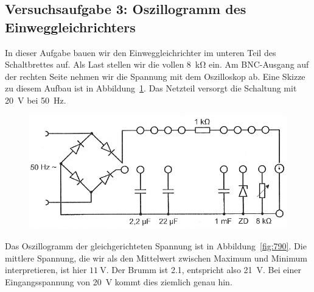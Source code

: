 \FloatBarrier
\subsection{Versuchsaufgabe 3: Oszillogramm des Einweggleichrichters}

In dieser Aufgabe bauen wir den Einweggleichrichter im unteren Teil des
Schaltbrettes auf. Als Last stellen wir die vollen \SI{8}{\kilo\ohm} ein. Am
BNC-Ausgang auf der rechten Seite nehmen wir die Spannung mit dem Oszilloskop
ab. Eine Skizze zu diesem Aufbau ist in Abbildung~\ref{fig:2-10}. Das Netzteil
versorgt die Schaltung mit \SI{20}{\volt} bei \SI{50}{\hertz}.

\begin{figure}[htbp]
	\centering
	\caption{%
		\cite[Abbildung~2.10]{physik313-Anleitung}
	}
	\label{fig:2-10}
	\includegraphics[width=\linewidth]{Bilder_aus_Anleitung/2-10.png}
\end{figure}

Das Oszillogramm der gleichgerichteten Spannung ist in
Abbildung~\ref{fig:790}. Die mittlere Spannung, die wir als den Mittelwert
zwischen Maximum und Minimum interpretieren, ist hier $\SI{11}\volt$. Der
Brumm ist \SI{2.1}{\division}, entspricht also \SI{21}{\volt}. Bei einer
Eingangsspannung von \SI{20}{\volt} kommt dies ziemlich genau hin.

